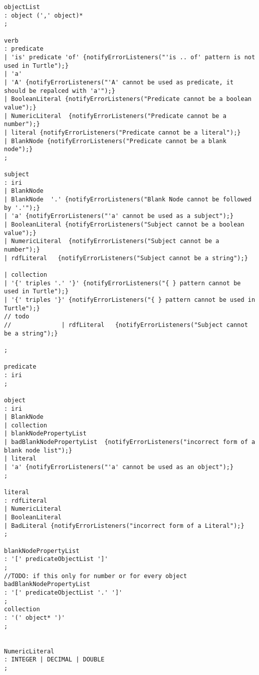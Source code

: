 \begin{appendices}
\begin{lstlisting}[breaklines,basicstyle=\ttfamily]
objectList
: object (',' object)*
;

verb
: predicate
| 'is' predicate 'of' {notifyErrorListeners("'is .. of' pattern is not used in Turtle");}
| 'a'
| 'A' {notifyErrorListeners("'A' cannot be used as predicate, it should be repalced with 'a'");}
| BooleanLiteral {notifyErrorListeners("Predicate cannot be a boolean value");}
| NumericLiteral  {notifyErrorListeners("Predicate cannot be a number");}
| literal {notifyErrorListeners("Predicate cannot be a literal");}
| BlankNode {notifyErrorListeners("Predicate cannot be a blank node");}
;

subject
: iri
| BlankNode
| BlankNode  '.' {notifyErrorListeners("Blank Node cannot be followed by '.'");}
| 'a' {notifyErrorListeners("'a' cannot be used as a subject");}
| BooleanLiteral {notifyErrorListeners("Subject cannot be a boolean value");}
| NumericLiteral  {notifyErrorListeners("Subject cannot be a number");}
| rdfLiteral   {notifyErrorListeners("Subject cannot be a string");}

| collection
| '{' triples '.' '}' {notifyErrorListeners("{ } pattern cannot be used in Turtle");}
| '{' triples '}' {notifyErrorListeners("{ } pattern cannot be used in Turtle");} 
// todo
//				| rdfLiteral   {notifyErrorListeners("Subject cannot be a string");}

;

predicate
: iri
;

object
: iri
| BlankNode
| collection
| blankNodePropertyList
| badBlankNodePropertyList  {notifyErrorListeners("incorrect form of a blank node list");}
| literal
| 'a' {notifyErrorListeners("'a' cannot be used as an object");}
;

literal
: rdfLiteral
| NumericLiteral
| BooleanLiteral
| BadLiteral {notifyErrorListeners("incorrect form of a Literal");}
;

blankNodePropertyList
: '[' predicateObjectList ']'
;
//TODO: if this only for number or for every object
badBlankNodePropertyList   
: '[' predicateObjectList '.' ']'
;
collection
: '(' object* ')'
;


NumericLiteral
: INTEGER | DECIMAL | DOUBLE
;


\end{lstlisting}
\end{appendices}

